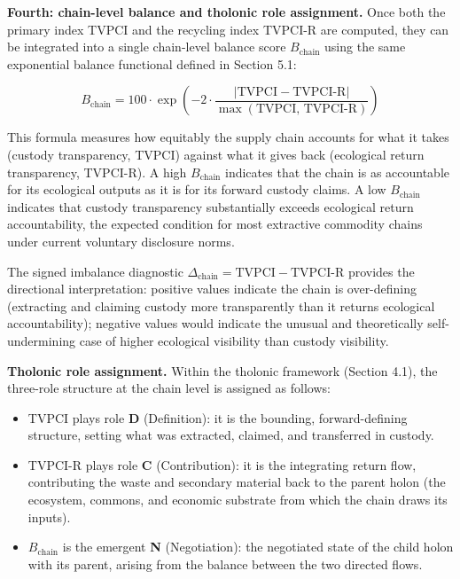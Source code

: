 \documentclass[12pt]{article}
\providecommand{\tightlist}{%
  \setlength{\itemsep}{0pt}\setlength{\parskip}{0pt}}
\begin{document}
\textbf{Fourth: chain-level balance and tholonic role assignment.} Once
both the primary index TVPCI and the recycling index TVPCI-R are
computed, they can be integrated into a single chain-level balance score
\(B_{\text{chain}}\) using the same exponential balance functional
defined in Section 5.1:

\[B_{\text{chain}} = 100 \cdot \exp\!\left(-2 \cdot \frac{|\text{TVPCI} - \text{TVPCI-R}|}{\max(\text{TVPCI},\,\text{TVPCI-R})}\right)\]

This formula measures how equitably the supply chain accounts for what
it takes (custody transparency, TVPCI) against what it gives back
(ecological return transparency, TVPCI-R). A high \(B_{\text{chain}}\)
indicates that the chain is as accountable for its ecological outputs as
it is for its forward custody claims. A low \(B_{\text{chain}}\)
indicates that custody transparency substantially exceeds ecological
return accountability, the expected condition for most extractive
commodity chains under current voluntary disclosure norms.

The signed imbalance diagnostic
\(\Delta_{\text{chain}} = \text{TVPCI} - \text{TVPCI-R}\) provides the
directional interpretation: positive values indicate the chain is
over-defining (extracting and claiming custody more transparently than
it returns ecological accountability); negative values would indicate
the unusual and theoretically self-undermining case of higher ecological
visibility than custody visibility.

\textbf{Tholonic role assignment.} Within the tholonic framework
(Section 4.1), the three-role structure at the chain level is assigned
as follows:

\begin{itemize}
\tightlist
\item
  TVPCI plays role \textbf{D} (Definition): it is the bounding,
  forward-defining structure, setting what was extracted, claimed, and
  transferred in custody.
\item
  TVPCI-R plays role \textbf{C} (Contribution): it is the integrating
  return flow, contributing the waste and secondary material back to the
  parent holon (the ecosystem, commons, and economic substrate from
  which the chain draws its inputs).
\item
  \(B_{\text{chain}}\) is the emergent \textbf{N} (Negotiation): the
  negotiated state of the child holon with its parent, arising from the
  balance between the two directed flows.
\end{itemize}
\end{document}
